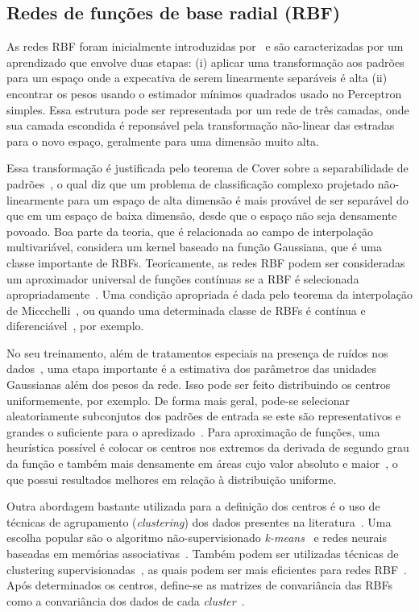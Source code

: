 \documentclass[conference]{IEEEtran}
\begin{document}
	\subsection{Redes de funções de base radial (RBF)}
	As redes RBF foram inicialmente introduzidas por~\cite{broomhead1988multivariablefi} e são caracterizadas por um aprendizado que envolve duas etapas: (i) aplicar uma transformação aos padrões para um espaço onde a expecativa de serem linearmente separáveis é alta (ii) encontrar os pesos usando o estimador mínimos quadrados usado no Perceptron simples. Essa estrutura pode ser representada por um rede de três camadas, onde sua camada escondida é reponsável pela transformação não-linear das estradas para o novo espaço, geralmente para uma dimensão muito alta. 
	
	Essa transformação é justificada pelo teorema de Cover sobre a separabilidade de padrões~\cite{cover1965geometrical}, o qual diz que um problema de classificação complexo projetado não-linearmente para um espaço de alta dimensão é mais provável de ser separável do que em um espaço de baixa dimensão, desde que o espaço não seja densamente povoado. Boa parte da teoria, que é relacionada ao campo de interpolação multivariável, considera um kernel baseado na função Gaussiana, que é uma classe importante de RBFs. Teoricamente, as redes RBF podem ser consideradas um aproximador universal de funções contínuas se a RBF é selecionada apropriadamente~\cite{poggio1990networks, park1991universal, liao2003relaxed}. Uma condição apropriada é dada pelo teorema da interpolação de Miccchelli~\cite{micchelli1986interpolation}, ou quando uma determinada classe de RBFs é contínua e diferenciável~\cite{park1991universal}, por exemplo.
	 
	No seu treinamento, além de tratamentos especiais na presença de ruídos nos dados~\cite{broomhead1988radial}, uma etapa importante é a estimativa dos parâmetros das unidades Gaussianas além dos pesos da rede. Isso pode ser feito distribuindo os centros uniformemente, por exemplo. De forma mais geral, pode-se selecionar aleatoriamente subconjutos dos padrões de entrada se este são representativos e grandes o suficiente para o apredizado~\cite{wu2012using}. Para aproximação de funções, uma heurística possível é colocar os centros nos extremos da derivada de segundo grau da função e também mais densamente em áreas cujo valor absoluto e maior~\cite{sanchez1995second}, o que possui resultados melhores em relação à distribuição uniforme.
	
	Outra abordagem bastante utilizada para a definição dos centros é o uso de técnicas de agrupamento (\textit{clustering}) dos dados presentes na literatura~\cite{du2006neural, du2010clustering}.  Uma escolha popular são o algoritmo não-supervisionado \textit{k-means}~\cite{moody1989fast} e redes neurais baseadas em memórias associativas~\cite{kohonen2012self}. Também podem ser utilizadas técnicas de clustering supervisionadas~\cite{chen1993hybrid}, as quais podem ser mais eficientes para redes RBF~\cite{wu2012using}. Após determinados os centros, define-se as matrizes de convariância das RBFs como a convariância dos dados de cada \textit{cluster}~\cite{wu2012using}. 
	
\end{document}
